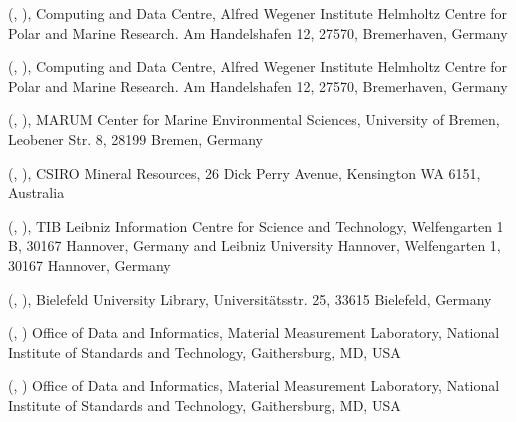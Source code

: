 \documentclass[a4paper,10pt,english]{sphinxmanual}
\begin{document}
\sphinxAtStartPar
{} (, ),
Computing and Data Centre, Alfred Wegener Institute Helmholtz Centre for
Polar and Marine Research. Am Handelshafen 12, 27570, Bremerhaven,
Germany

\sphinxAtStartPar
{} (, ),
Computing and Data Centre, Alfred Wegener Institute Helmholtz Centre for
Polar and Marine Research. Am Handelshafen 12, 27570, Bremerhaven,
Germany

\sphinxAtStartPar
{} (, ),
MARUM \sphinxhyphen{} Center for Marine Environmental Sciences, University of Bremen,
Leobener Str. 8, 28199 Bremen, Germany

\sphinxAtStartPar
{} (, ),
CSIRO Mineral Resources, 26 Dick Perry Avenue, Kensington WA 6151, Australia

\sphinxAtStartPar
{} (, ),
TIB \textendash{} Leibniz Information Centre for Science and Technology,
Welfengarten 1 B, 30167 Hannover, Germany and Leibniz University
Hannover, Welfengarten 1, 30167 Hannover, Germany

\sphinxAtStartPar
{} (, ),
Bielefeld University Library, Universitätsstr. 25, 33615 Bielefeld, Germany

\sphinxAtStartPar
{} (, )
Office of Data and Informatics, Material Measurement Laboratory,
National Institute of Standards and Technology, Gaithersburg, MD, USA

\sphinxAtStartPar
{} (, )
Office of Data and Informatics, Material Measurement Laboratory,
National Institute of Standards and Technology, Gaithersburg, MD, USA
\end{document}

